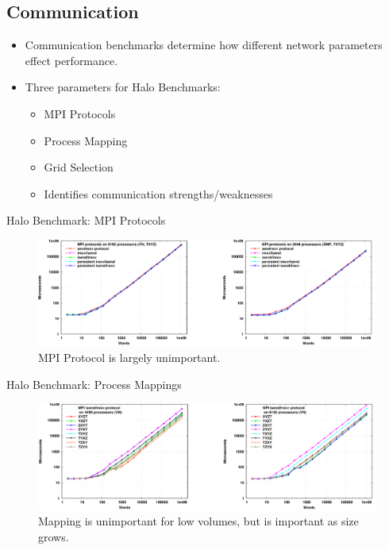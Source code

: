 \documentclass{beamer}
\begin{document}
\subsection{Communication}
\begin{frame}
\begin{itemize}
\item Communication benchmarks determine how different network parameters
effect performance.
\item Three parameters for Halo Benchmarks:
\begin{itemize}
\item MPI Protocols
\item Process Mapping
\item Grid Selection
\item Identifies communication strengths/weaknesses
\end{itemize}
\end{itemize}
\end{frame}

\begin{frame}{Halo Benchmark: MPI Protocols}
\begin{figure}
\includegraphics[scale=0.45]{figs/halo1.png}
\caption{MPI Protocol is largely unimportant.}
\end{figure}
\end{frame}

\begin{frame}{Halo Benchmark: Process Mappings}
\begin{figure}
\includegraphics[scale=0.45]{figs/halo2.png}
\caption{Mapping is unimportant for low volumes, but is important as size grows.}
\end{figure}
\end{frame}
\end{document}
